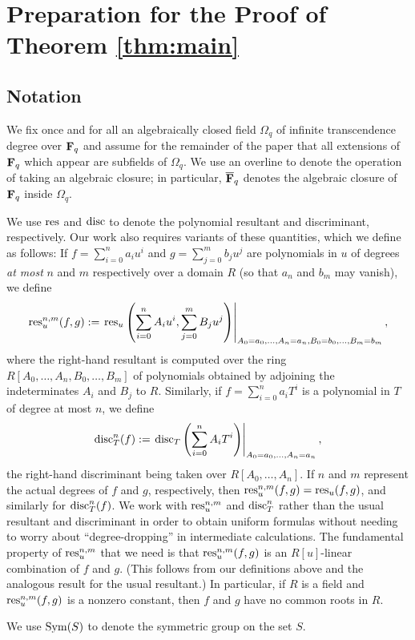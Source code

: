 \documentclass[a4paper]{compositio}
\begin{document}
\section{Preparation for the Proof of Theorem \ref{thm:main}}
\subsection{Notation} We fix once and for all an algebraically closed
field $\Omega_q$ of infinite transcendence degree over $\mathbf{F}_q$ and
assume for the remainder of the paper that all extensions of $\mathbf{F}_q$
which appear are subfields of $\Omega_q$. We use an overline to
denote the operation of taking an algebraic closure; in particular,
$\overline{\mathbf{F}}_q$ denotes the algebraic closure of $\mathbf{F}_{q}$ inside
$\Omega_q$.

We use $\mathrm{res}$ and $\mathrm{disc}$ to denote the polynomial resultant and
discriminant, respectively. Our work also requires variants of these
quantities, which we define as follows: If $f = \sum_{i=0}^{n}a_i
u^i$ and $g = \sum_{j=0}^{m}{b_j u^j}$ are polynomials in $u$ of
degrees \emph{at most} $n$ and $m$ respectively over a domain $R$
(so that $a_n$ and $b_m$ may vanish), we define
\[ \mathrm{res}_u^{n,m}(f,g):= \left.\mathrm{res}_u\left(\sum_{i=0}^{n}{A_i u^i},
\sum_{j=0}^{m} B_j u^j\right)\right|_{A_0= a_0, \dots, A_n= a_n,
B_0=b_0, \dots, B_m = b_m},
\] where the right-hand resultant is computed
over the ring $R[A_0, \dots, A_n, B_0, \dots, B_m]$ of polynomials
obtained by adjoining the indeterminates $A_i$ and $B_j$ to $R$.
Similarly, if $f = \sum_{i=0}^{n}a_i T^i$ is a polynomial in $T$ of
degree at most $n$, we define
\[ \mathrm{disc}_T^n(f) := \left.\mathrm{disc}_T\left(\sum_{i=0}^{n}{A_i T^i}\right)\right|_{A_0 = a_0, \dots,
A_n = a_n}, \] the right-hand discriminant being taken over
$R[A_0,\dots,A_n]$. If $n$ and $m$ represent the actual degrees of
$f$ and $g$, respectively, then $\mathrm{res}_u^{n,m}(f,g) = \mathrm{res}_{u}(f,g)$,
and similarly for $\mathrm{disc}_T^{n}(f)$. We work with $\mathrm{res}_u^{n,m}$ and
$\mathrm{disc}_T^n$ rather than the usual resultant and discriminant in
order to obtain uniform formulas without needing to worry about
``degree-dropping'' in intermediate calculations. The fundamental
property of $\mathrm{res}_u^{n,m}$ that we need is that $\mathrm{res}_u^{n,m}(f,g)$
is an $R[u]$-linear combination of $f$ and $g$. (This follows from
our definitions above and the analogous result for the usual
resultant.) In particular, if $R$ is a field and $\mathrm{res}_u^{n,m}(f,g)$
is a nonzero constant, then $f$ and $g$ have no common roots in $R$.

We use $\mathrm{Sym}(S)$ to denote the symmetric group on the set $S$.
\end{document}
